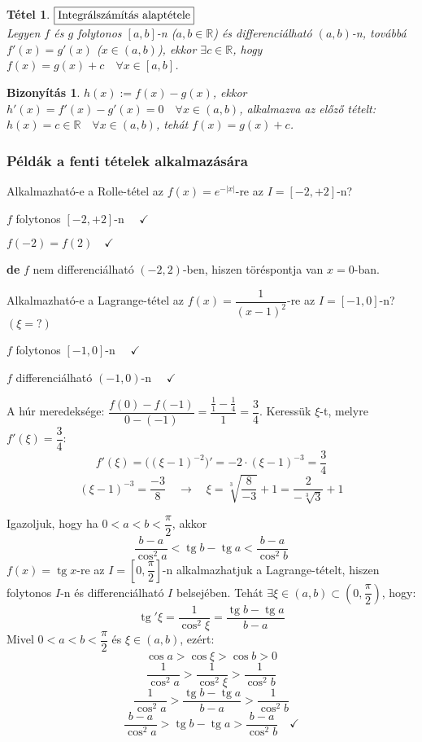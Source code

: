 \documentclass[a4paper,12pt,twoside]{book}
\DeclareMathOperator{\tg}{tg}
\newtheorem{tetel}{Tétel}[chapter]
\theoremstyle{break}
\newtheorem{biz}{Bizonyítás}[chapter]
\theoremstyle{plain}
\begin{document}
\begin{tetel}\label{IntAlapI}$\boxed{$Integrálszámítás alaptétele$}$\\
 Legyen $f$ és $g$ folytonos $[a, b]$-n ($a,b\in\mathbb{R}$) és differenciálható $(a,b)$-n, továbbá $f'(x)=g'(x)$ ($x\in(a,b)$), ekkor $\exists c\in\mathbb{R}$, hogy $f(x)=g(x)+c \quad \forall x\in[a, b]$.
\end{tetel}
\begin{biz}
 $h(x) := f(x)-g(x)$, ekkor $h'(x) = f'(x)-g'(x) = 0 \quad \forall x\in(a,b)$, alkalmazva az előző tételt: $h(x) = c\in\mathbb{R} \quad \forall x\in(a,b)$, tehát $f(x)=g(x)+c$.
\end{biz}

\subsubsection{Példák a fenti tételek alkalmazására}

\begin{enumerate*}
 \item Alkalmazható-e a Rolle-tétel az $f(x)=e^{-|x|}$-re az $I=[-2,+2]$-n?
  \begin{itemize*}
   \item $f$ folytonos $[-2,+2]$-n $\quad \checkmark$
   \item $f(-2)=f(2) \quad \checkmark$
   \item \textbf{de} $f$ nem differenciálható $(-2,2)$-ben, hiszen töréspontja van $x=0$-ban.
  \end{itemize*}
 \item Alkalmazható-e a Lagrange-tétel az $f(x)=\dfrac{1}{(x-1)^2}$-re az $I=[-1,0]$-n? $(\xi=?)$
  \begin{itemize*}
   \item $f$ folytonos $[-1,0]$-n $\quad \checkmark$
   \item $f$ differenciálható $(-1,0)$-n $\quad \checkmark$
  \end{itemize*}
  A húr meredeksége: $\dfrac{f(0)-f(-1)}{0-(-1)} = \dfrac{\frac{1}{1}-\frac{1}{4}}{1} = \dfrac{3}{4}$. Keressük $\xi$-t, melyre $f'(\xi) = \dfrac{3}{4}$:
 \[f'(\xi) = \Big((\xi-1)^{-2}\Big)' = -2\cdot (\xi-1)^{-3} = \dfrac{3}{4}\]
\[(\xi-1)^{-3} = \dfrac{-3}{8} \quad \rightarrow \quad \xi = \sqrt[3]{\dfrac{8}{-3}}+1 = \dfrac{2}{-\sqrt[3]{3}}+1\]
 \item Igazoljuk, hogy ha $0<a<b<\dfrac{\pi}{2}$, akkor
\[\frac{b-a}{\cos^2 a}<\tg b - \tg a < \frac{b-a}{\cos^2 b}\]
$f(x) = \tg x$-re az $I=\left[0,\dfrac{\pi}{2}\right]$-n alkalmazhatjuk a Lagrange-tételt, hiszen folytonos $I$-n és differenciálható $I$ belsejében. Tehát $\exists \xi \in (a, b) \subset \left(0,\dfrac{\pi}{2}\right)$, hogy:
\[\tg' \xi = \frac{1}{\cos^2 \xi} = \frac{\tg b - \tg a}{b-a}\]
Mivel $0<a<b<\dfrac{\pi}{2}$ és $\xi\in(a, b)$, ezért:
\[\cos a>\cos \xi > \cos b > 0\]
\[\frac{1}{\cos^2 a} > \frac{1}{\cos^2 \xi} > \frac{1}{\cos^2 b} \]
\[\frac{1}{\cos^2 a} > \frac{\tg b - \tg a}{b-a} > \frac{1}{\cos^2 b} \]
\[\frac{b-a}{\cos^2 a} > \tg b - \tg a > \frac{b-a}{\cos^2 b} \quad \checkmark \]
\end{enumerate*}
\end{document}
